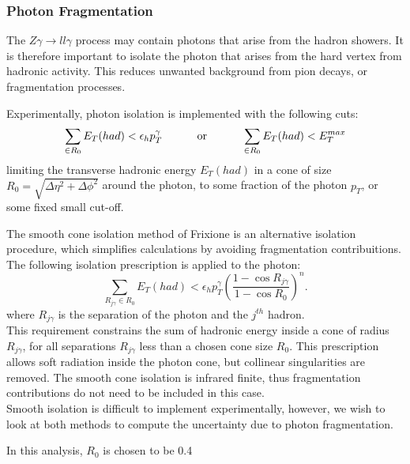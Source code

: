 \documentclass[11pt,a4paper,final]{report}
\newcommand{\Zgam}{$Z\gamma\rightarrow ll\gamma$ }
\begin{document}
\subsubsection{Photon Fragmentation}
The \Zgam process may contain photons that arise from the hadron showers. It is therefore important to isolate the photon that arises from the hard vertex from hadronic activity. This reduces unwanted background from pion decays, or fragmentation processes.

Experimentally, photon isolation is implemented with the following cuts:
\begin{equation}
\sum_{\in R_0} E_T(had) < \epsilon_h p_T^\gamma \text{\hspace{1cm} or \hspace{1cm}} \sum_{\in R_0} E_T(had) < E_T^{max}
\end{equation}
\label{eq:photon_isol}
limiting the transverse hadronic energy $E_T(had)$ in a cone of size $R_0 = \sqrt{\Delta\eta^2 + \Delta\phi^2}$ around the photon, to some fraction of the photon $p_T$, or some fixed small cut-off.

The smooth cone isolation method of Frixione \cite{frixione} is an alternative isolation procedure, which simplifies calculations by avoiding fragmentation contribuitions. The following isolation prescription is applied to the photon:
\begin{equation}
	\sum_{R_{j\gamma} \in R_0} E_T(had) < \epsilon_h p_T^\gamma \left(\frac{1-\cos R_{j\gamma}}{1-\cos R_0}\right)^n.
\end{equation}
\label{eq:frix_isol}
where $R_{j\gamma}$ is the separation of the photon and the $j^{th}$ hadron.\\
This requirement constrains the sum of hadronic energy inside a cone of radius $R_{j\gamma}$, for all separations $R_{j\gamma}$ less than a chosen cone size $R_0$. This prescription allows soft radiation inside the photon cone, but collinear singularities are removed. The smooth cone isolation is infrared finite, thus fragmentation contributions do not need to be included in this case.\\
Smooth isolation is difficult to implement experimentally, however, we wish to look at both methods to compute the uncertainty due to photon fragmentation.

In this analysis, $R_0$ is chosen to be 0.4
\end{document}
